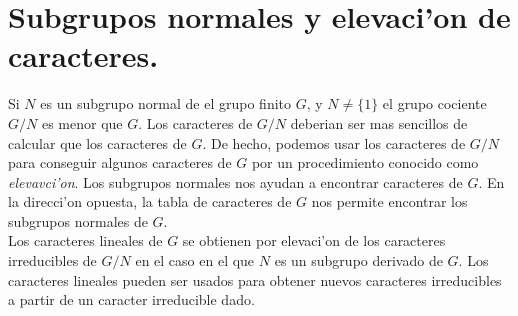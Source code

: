 \documentclass[a4paper,openright,12pt]{book}
\numberwithin{equation}{section} %
\begin{document}
\section{Subgrupos normales y elevaci'on de caracteres.}
Si $N$ es un subgrupo normal de el grupo finito $G$, y $N \neq \{ 1 \}$ el  grupo cociente $G/N$ es menor que $G$. Los caracteres de $G/N$ deberian ser mas sencillos de calcular que los caracteres de $G$. De hecho, podemos usar los caracteres de $G/N$ para conseguir algunos caracteres de $G$ por un procedimiento conocido como \emph{elevavci'on}. Los subgrupos normales nos ayudan a encontrar caracteres de $G$. En la direcci'on opuesta, la tabla de caracteres de $G$ nos permite encontrar los subgrupos normales de $G$.\\
Los caracteres lineales de $G$ se obtienen por elevaci'on de los caracteres irreducibles de $G/N$ en el caso en el que $N$ es un subgrupo derivado de $G$. Los caracteres lineales pueden ser usados para obtener nuevos caracteres irreducibles a partir de un caracter irreducible dado.
\end{document}
